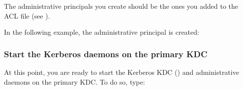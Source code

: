 \documentclass[letterpaper,10pt,english]{sphinxmanual}
\begin{document}
\sphinxAtStartPar
The administrative principals you create should be the ones you added
to the ACL file (see {\hyperref[\detokenize{admin/install_kdc:admin-acl}]{}}).

\sphinxAtStartPar
In the following example, the administrative principal 
is created:

\begin{sphinxVerbatim}[commandchars=\\\{\}]
 

  

    
 
         
         
  
\end{sphinxVerbatim}


\subsubsection{Start the Kerberos daemons on the primary KDC}
\label{\detokenize{admin/install_kdc:start-the-kerberos-daemons-on-the-primary-kdc}}\label{\detokenize{admin/install_kdc:start-kdc-daemons}}
\sphinxAtStartPar
At this point, you are ready to start the Kerberos KDC
({\hyperref[\detokenize{admin/admin_commands/krb5kdc:krb5kdc-8}]{}}) and administrative daemons on the primary KDC.  To
do so, type:
\end{document}
